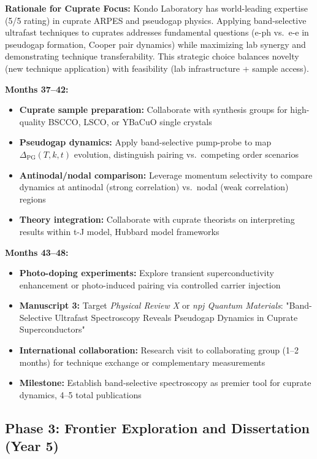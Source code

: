 \documentclass[12pt,a4paper]{article}
\begin{document}
\textbf{Rationale for Cuprate Focus:} Kondo Laboratory has world-leading expertise (5/5 rating) in cuprate ARPES and pseudogap physics. Applying band-selective ultrafast techniques to cuprates addresses fundamental questions (e-ph vs.~e-e in pseudogap formation, Cooper pair dynamics) while maximizing lab synergy and demonstrating technique transferability. This strategic choice balances novelty (new technique application) with feasibility (lab infrastructure + sample access).

\textbf{Months 37--42:}
\begin{itemize}
    \item \textbf{Cuprate sample preparation:} Collaborate with synthesis groups for high-quality BSCCO, LSCO, or YBaCuO single crystals
    \item \textbf{Pseudogap dynamics:} Apply band-selective pump-probe to map $\Delta_{\text{PG}}(T,k,t)$ evolution, distinguish pairing vs.~competing order scenarios
    \item \textbf{Antinodal/nodal comparison:} Leverage momentum selectivity to compare dynamics at antinodal (strong correlation) vs.~nodal (weak correlation) regions
    \item \textbf{Theory integration:} Collaborate with cuprate theorists on interpreting results within t-J model, Hubbard model frameworks
\end{itemize}

\textbf{Months 43--48:}
\begin{itemize}
    \item \textbf{Photo-doping experiments:} Explore transient superconductivity enhancement or photo-induced pairing via controlled carrier injection
    \item \textbf{Manuscript 3:} Target \textit{Physical Review X} or \textit{npj Quantum Materials}: "Band-Selective Ultrafast Spectroscopy Reveals Pseudogap Dynamics in Cuprate Superconductors"
    \item \textbf{International collaboration:} Research visit to collaborating group (1--2 months) for technique exchange or complementary measurements
    \item \textbf{Milestone:} Establish band-selective spectroscopy as premier tool for cuprate dynamics, 4--5 total publications
\end{itemize}

\subsection{Phase 3: Frontier Exploration and Dissertation (Year 5)}
\end{document}
